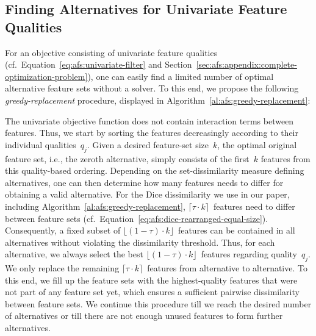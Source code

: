 \documentclass{article}
\theoremstyle{definition}
\begin{document}
\subsection{Finding Alternatives for Univariate Feature Qualities}
\label{sec:afs:appendix:univariate-search-algorithm}

For an objective consisting of univariate feature qualities (cf.~Equation~\ref{eq:afs:univariate-filter} and Section~\ref{sec:afs:appendix:complete-optimization-problem}), one can easily find a limited number of optimal alternative feature sets without a solver.
To this end, we propose the following \emph{greedy-replacement} procedure, displayed in Algorithm~\ref{al:afs:greedy-replacement}:

The univariate objective function does not contain interaction terms between features.
Thus, we start by sorting the features decreasingly according to their individual qualities~$q_j$.
Given a desired feature-set size~$k$, the optimal original feature set, i.e., the zeroth alternative, simply consists of the first~$k$ features from this quality-based ordering.
Depending on the set-dissimilarity measure defining alternatives, one can then determine how many features needs to differ for obtaining a valid alternative.
For the Dice dissimilarity we use in our paper, including Algorithm~\ref{al:afs:greedy-replacement}, $\lceil \tau \cdot k \rceil$~features need to differ between feature sets (cf.~Equation~\ref{eq:afs:dice-rearranged-equal-size}).
Consequently, a fixed subset of $\lfloor (1 - \tau) \cdot k \rfloor$~features can be contained in all alternatives without violating the dissimilarity threshold.
Thus, for each alternative, we always select the best $\lfloor (1 - \tau) \cdot k \rfloor$~features regarding quality~$q_j$.
We only replace the remaining $\lceil \tau \cdot k \rceil$~features from alternative to alternative.
To this end, we fill up the feature sets with the highest-quality features that were not part of any feature set yet, which ensures a sufficient pairwise dissimilarity between feature sets.
We continue this procedure till we reach the desired number of alternatives or till there are not enough unused features to form further alternatives.
\end{document}
